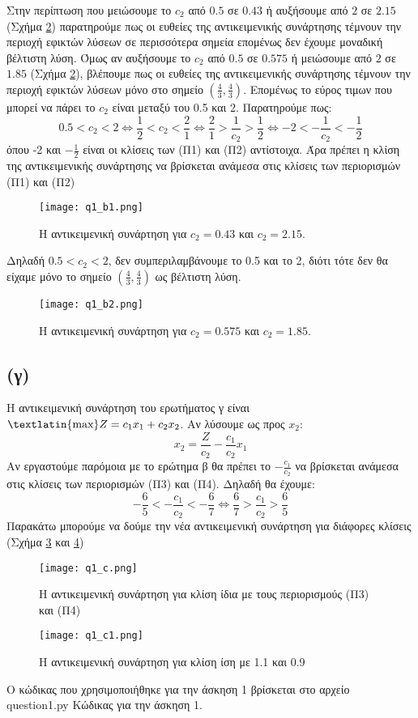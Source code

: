 \documentclass[12pt]{report}
\begin{document}
Στην περίπτωση που μειώσουμε το $c_2$ από $0.5$ σε $0.43$ ή αυξήσουμε από $2$
σε $2.15$ (Σχήμα \ref{fig:1_b2})
παρατηρούμε πως οι ευθείες της αντικειμενικής συνάρτησης τέμνουν την περιοχή
εφικτών λύσεων σε περισσότερα
σημεία επομένως δεν έχουμε μοναδική βέλτιστη λύση. Όμως αν αυξήσουμε το $c_2$
από $0.5$ σε $0.575$ ή μειώσουμε
από $2$ σε $1.85$ (Σχήμα \ref{fig:1_b2}), βλέπουμε πως οι ευθείες της
αντικειμενικής συνάρτησης τέμνουν την περιοχή
εφικτών λύσεων μόνο στο σημείο $(\frac{4}{3}, \frac{4}{3})$.
Επομένως το εύρος τιμων που μπορεί να πάρει το $c_2$ είναι μεταξύ του 0.5 και
2. Παρατηρούμε πως:
$$ 0.5 < c_2 < 2 \Leftrightarrow \frac{1}{2} < c_2 < \frac{2}{1}
    \Leftrightarrow
    \frac{2}{1} > \frac{1}{c_2} > \frac{1}{2} \Leftrightarrow -2 < -\frac{1}{c_2} <
    -\frac{1}{2}$$
όπου -2 και $-\frac{1}{2}$ είναι οι κλίσεις των (Π1) και (Π2) αντίστοιχα. Άρα
πρέπει η κλίση της αντικειμενικής
συνάρτησης να βρίσκεται ανάμεσα στις κλίσεις των περιορισμών (Π1) και (Π2)
\begin{figure}[h]
    \texttt{[image: q1\_b1.png]}
    \caption{Η αντικειμενική συνάρτηση για $c_2 = 0.43$ και $c_2 = 2.15$.}
    \label{fig:1_b1}
\end{figure}

Δηλαδή $0.5 < c_2 < 2$, δεν συμπεριλαμβάνουμε το 0.5 και το 2, διότι τότε δεν
θα είχαμε μόνο το
σημείο $(\frac{4}{3}, \frac{4}{3})$ ως βέλτιστη λύση.

\begin{figure}[!t]
    \texttt{[image: q1\_b2.png]}
    \caption{Η αντικειμενική συνάρτηση για $c_2 = 0.575$ και $c_2 = 1.85$.}
    \label{fig:1_b2}
\end{figure}

\subsection*{(γ)}
Η αντικειμενική συνάρτηση του ερωτήματος γ είναι $\text{\textlatin{max}} Z =
    c_1 x_1 + c_2 x_2$. Αν λύσουμε ως προς $x_2$:
$$ x_2 = \frac{Z}{c_2} - \frac{c_1}{c_2}x_1 $$
Αν εργαστούμε παρόμοια με το ερώτημα β θα πρέπει το $-\frac{c_1}{c_2}$ να
βρίσκεται ανάμεσα στις κλίσεις των περιορισμών
(Π3) και (Π4). Δηλαδή θα έχουμε:
$$ -\frac{6}{5} < -\frac{c_1}{c_2} <-\frac{6}{7} \Leftrightarrow \frac{6}{7} >
    \frac{c_1}{c_2} > \frac{6}{5}$$
Παρακάτω μπορούμε να δούμε την νέα αντικειμενική συνάρτηση για διάφορες κλίσεις
(Σχήμα \ref{fig:1_c} και \ref{fig:1_c1})

\begin{figure}[h]
    \texttt{[image: q1\_c.png]}
    \caption{Η αντικειμενική συνάρτηση για κλίση ίδια με τους περιορισμούς (Π3)
        και (Π4)}
    \label{fig:1_c}
\end{figure}
\begin{figure}[h]
    \texttt{[image: q1\_c1.png]}
    \caption{Η αντικειμενική συνάρτηση για κλίση ίση με 1.1 και 0.9}
    \label{fig:1_c1}
\end{figure}
Ο κώδικας που χρησιμοποιήθηκε για την άσκηση 1 βρίσκεται στο αρχείο
\textlatin{question1.py}
\clearpage
Κώδικας για την άσκηση 1.

\clearpage
\end{document}
